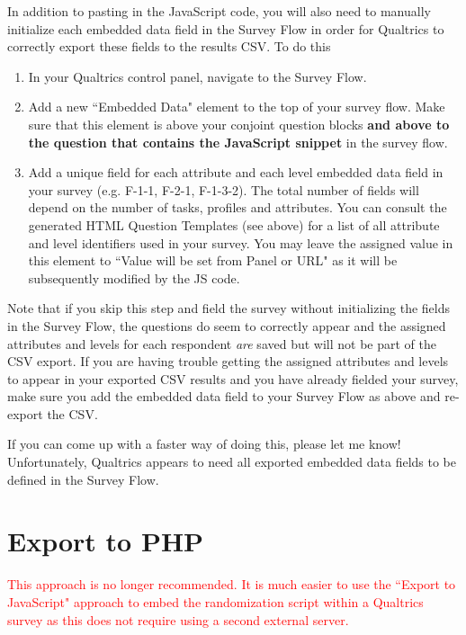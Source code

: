 \documentclass[12pt]{article}
\begin{document}
In addition to pasting in the JavaScript code, you will also need to manually initialize each embedded data field in the Survey Flow in order for Qualtrics to correctly export these fields to the results CSV. To do this

\begin{enumerate}
\item In your Qualtrics control panel, navigate to the Survey Flow.
\item Add a new ``Embedded Data" element to the top of your survey flow. Make sure that this element is above your conjoint question blocks \textbf{and above to the question that contains the JavaScript snippet} in the survey flow.
\item Add a unique field for each attribute and each level embedded data field in your survey (e.g. F-1-1, F-2-1, F-1-3-2). The total number of fields will depend on the number of tasks, profiles and attributes. You can consult the generated HTML Question Templates (see above) for a list of all attribute and level identifiers used in your survey. You may leave the assigned value in this element to ``Value will be set from Panel or URL" as it will be subsequently modified by the JS code.
\end{enumerate}

Note that if you skip this step and field the survey without initializing the fields in the Survey Flow, the questions do seem to correctly appear and the assigned attributes and levels for each respondent \textit{are} saved but will not be part of the CSV export. If you are having trouble getting the assigned attributes and levels to appear in your exported CSV results and you have already fielded your survey, make sure you add the embedded data field to your Survey Flow as above and re-export the CSV.

If you can come up with a faster way of doing this, please let me know! Unfortunately, Qualtrics appears to need all exported embedded data fields to be defined in the Survey Flow.

\section{Export to PHP}


\textcolor{red}{\large This approach is no longer recommended. It is much easier to use the ``Export to JavaScript" approach to embed the randomization script within a Qualtrics survey as this does not require using a second external server.}
\end{document}
